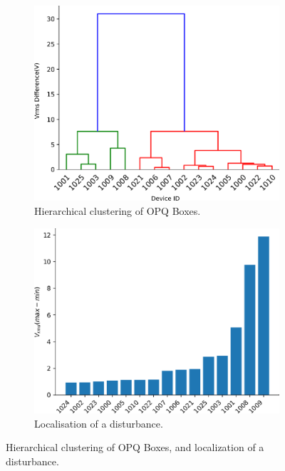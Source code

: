 \begin{figure}[ht]

    \centering
    \begin{subfigure}{.5\textwidth}
        \centering
        \includegraphics[width=0.9\linewidth]{images/pilot/clustring.png}
        \caption{Hierarchical clustering of OPQ Boxes.}
        \label{fig:clustering}
    \end{subfigure}%
    \begin{subfigure}{.5\textwidth}
        \centering
        \includegraphics[width=0.9\linewidth]{images/pilot/localisation.png}
        \caption{Localisation of a disturbance.}
        \label{fig:localisation}
    \end{subfigure}
    \caption{Hierarchical clustering of OPQ Boxes, and localization of a disturbance.}
    \label{fig:localization-clustering}
\end{figure}

